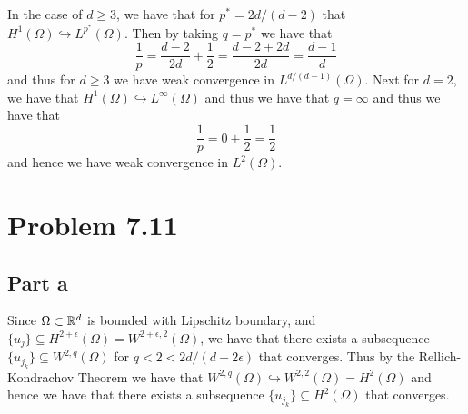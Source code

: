 \documentclass[12pt]{report}
\begin{document}
In the case of $d \geq 3$, we have that for $p^* = 2d/(d-2)$ that $H^1(\Omega) \hookrightarrow L^{p^*}(\Omega)$. Then by taking $q = p^*$ we have that
\begin{equation*}
  \frac{1}{p} = \frac{d-2}{2d} + \frac{1}{2} = \frac{d-2 + 2d}{2d} = \frac{d-1}{d}
\end{equation*}
and thus for $d \geq 3$ we have weak convergence in $L^{d/(d-1)}(\Omega)$. Next for $d = 2$, we have that $H^1(\Omega) \hookrightarrow L^{\infty}(\Omega)$ and thus we have that $q = \infty$ and thus we have that
\begin{equation*}
  \frac{1}{p} = 0 + \frac{1}{2} = \frac{1}{2}
\end{equation*}
and hence we have weak convergence in $L^2(\Omega)$.
\section*{Problem 7.11}
\subsection*{Part a}
Since $\Omega \subset \mathbb{R}^d$ is bounded with Lipschitz boundary, and $\{u_j\} \subseteq H^{2 + \epsilon}(\Omega) = W^{2+\epsilon, 2}(\Omega)$, we have that there exists a subsequence $\{u_{j_k}\} \subseteq W^{2,q}(\Omega)$ for $q < 2 < 2d/(d - 2\epsilon)$ that converges. Thus by the Rellich-Kondrachov Theorem we have that $W^{2,q}(\Omega) \hookrightarrow W^{2,2}(\Omega) = H^2(\Omega)$ and hence we have that there exists a subsequence $\{u_{j_k}\} \subseteq H^2(\Omega)$ that converges. 
\end{document}
